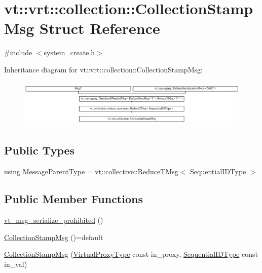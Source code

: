 \hypertarget{structvt_1_1vrt_1_1collection_1_1_collection_stamp_msg}{}\section{vt\+:\+:vrt\+:\+:collection\+:\+:Collection\+Stamp\+Msg Struct Reference}
\label{structvt_1_1vrt_1_1collection_1_1_collection_stamp_msg}


{\ttfamily \#include $<$system\+\_\+create.\+h$>$}

Inheritance diagram for vt\+:\+:vrt\+:\+:collection\+:\+:Collection\+Stamp\+Msg\+:\begin{figure}[H]
\begin{center}
\leavevmode
\includegraphics[height=2.299795cm]{structvt_1_1vrt_1_1collection_1_1_collection_stamp_msg}
\end{center}
\end{figure}
\subsection*{Public Types}
\begin{DoxyCompactItemize}
\item 
using \hyperlink{structvt_1_1vrt_1_1collection_1_1_collection_stamp_msg_ac804b80a7abb715cc14b087e8714352a}{Message\+Parent\+Type} = \hyperlink{namespacevt_1_1collective_a28b82d5d48c9bc6e4fd738fcbf9e0f62}{vt\+::collective\+::\+Reduce\+T\+Msg}$<$ \hyperlink{namespacevt_a3063d4db3b879d6dd2c7b8d50995c7f6}{Sequential\+I\+D\+Type} $>$
\end{DoxyCompactItemize}
\subsection*{Public Member Functions}
\begin{DoxyCompactItemize}
\item 
\hyperlink{structvt_1_1vrt_1_1collection_1_1_collection_stamp_msg_a7718d6f0ea3e20cff67e3700149a2d38}{vt\+\_\+msg\+\_\+serialize\+\_\+prohibited} ()
\item 
\hyperlink{structvt_1_1vrt_1_1collection_1_1_collection_stamp_msg_ae285a89b90d6975acfcb20e51c6ad3d0}{Collection\+Stamp\+Msg} ()=default
\item 
\hyperlink{structvt_1_1vrt_1_1collection_1_1_collection_stamp_msg_abc2eccf793579917467c898d4ea02a72}{Collection\+Stamp\+Msg} (\hyperlink{namespacevt_a1b417dd5d684f045bb58a0ede70045ac}{Virtual\+Proxy\+Type} const in\+\_\+proxy, \hyperlink{namespacevt_a3063d4db3b879d6dd2c7b8d50995c7f6}{Sequential\+I\+D\+Type} const in\+\_\+val)
\end{DoxyCompactItemize}
